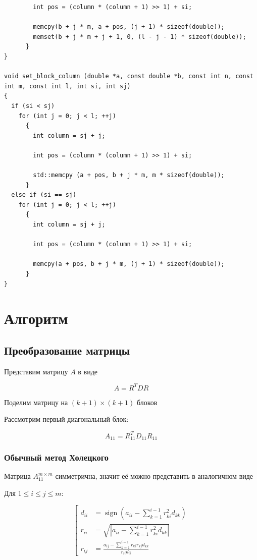 \documentclass[a4paper,12pt]{article}
\begin{document}
\begin{lstlisting}
        int pos = (column * (column + 1) >> 1) + si;
        
        memcpy(b + j * m, a + pos, (j + 1) * sizeof(double));
        memset(b + j * m + j + 1, 0, (l - j - 1) * sizeof(double));
      }
}

void set_block_column (double *a, const double *b, const int n, const int m, const int l, int si, int sj)
{
  if (si < sj)
    for (int j = 0; j < l; ++j)
      {
        int column = sj + j;
        
        int pos = (column * (column + 1) >> 1) + si;
        
        std::memcpy (a + pos, b + j * m, m * sizeof(double));
      }
  else if (si == sj)
    for (int j = 0; j < l; ++j)
      {
        int column = sj + j;
        
        int pos = (column * (column + 1) >> 1) + si;
        
        memcpy(a + pos, b + j * m, (j + 1) * sizeof(double));
      }
}
\end{lstlisting}

\section{Алгоритм}

\subsection{Преобразование матрицы}

Представим матрицу $A$ в виде

$$
A = R^T D R
$$

Поделим матрицу на $(k+1) \times (k+1)$ блоков

Рассмотрим первый диагональный блок:

$$
A_{11} = R_{11}^T D_{11} R_{11}
$$


\subsubsection{Обычный метод Холецкого}

Матрица $A_{11}^{m \times m}$ симметрична, значит её можно представить
в аналогичном виде

Для $1 \leq i \leq j \leq m$:

$$
\left[
\begin{aligned}
  d_{ii} &= \operatorname{sign}(a_{ii} - \sum_{k=1}^{i-1} r_{ki}^2 d_{kk}) \\
  r_{ii} &= \sqrt{\left| a_{ii} - \sum_{k=1}^{i-1} r_{ki}^2 d_{kk} \right|} \\
  r_{ij} &= \frac{a_{ij} - \sum_{k=1}^{i-1} r_{ki} r_{kj} d_{kk}}{r_{ii} d_{ii}}
\end{aligned}
\right.
$$
\end{document}
